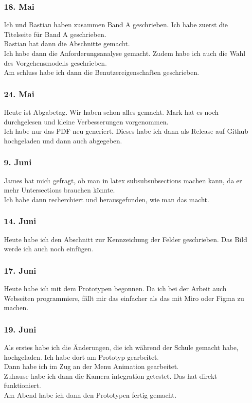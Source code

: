 \documentclass[10pt]{article}
\newcounter{subsubsubsection}[subsubsection]
\begin{document}
	\subsubsection{18. Mai}
	Ich und Bastian haben zusammen Band A geschrieben. Ich habe zuerst die Titelseite für Band A geschrieben.\\
	Bastian hat dann die Abschnitte gemacht.\\
	Ich habe dann die Anforderungsanalyse gemacht. Zudem habe ich auch die Wahl des Vorgehensmodells geschrieben.\\
	Am schluss habe ich dann die Benutzereigenschaften geschrieben.
	\subsubsection{24. Mai}
	Heute ist Abgabetag. Wir haben schon alles gemacht. Mark hat es noch durchgelesen und kleine Verbesserungen vorgenommen.\\
	Ich habe nur das PDF neu generiert. Dieses habe ich dann als Release auf Github hochgeladen und dann auch abgegeben.
	\subsubsection{9. Juni}
	James hat mich gefragt, ob man in latex subsubsubsections machen kann, da er mehr Untersections brauchen könnte.\\
	Ich habe dann recherchiert und herausgefunden, wie man das macht.
	\subsubsection{14. Juni}
	Heute habe ich den Abschnitt zur Kennzeichung der Felder geschrieben. Das Bild werde ich auch noch einfügen.\\
	\subsubsection{17. Juni}
	Heute habe ich mit dem Prototypen begonnen. Da ich bei der Arbeit auch Webseiten programmiere, fällt mir das einfacher als das mit Miro oder Figma zu machen.
	\subsubsection{19. Juni}
	Als erstes habe ich die Änderungen, die ich während der Schule gemacht habe, hochgeladen. Ich habe dort am Prototyp gearbeitet.\\
	Dann habe ich im Zug an der Menu Animation gearbeitet.\\
	Zuhause habe ich dann die Kamera integration getestet. Das hat direkt funktioniert.\\
	Am Abend habe ich dann den Prototypen fertig gemacht.
\end{document}

